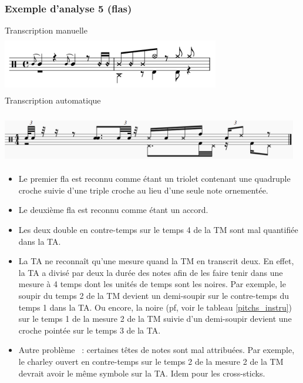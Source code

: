 \subsubsection{Exemple d’analyse 5 (flas)}
\label{flas}
Transcription manuelle\\
\includegraphics[height=25mm, width=95mm]{
z_images/4_experimentations/1_analyses/2_flas/0_124_funk_95_fill_4-4.png}\\
Transcription automatique\\\\
\includegraphics[height=20mm, width=130mm]{
z_images/4_experimentations/1_analyses/2_flas/1_124_funk_95_fill_4-4.png}\\

\begin{itemize}
	\item Le premier fla est reconnu comme étant un triolet contenant une
        quadruple croche suivie d’une triple croche au lieu d’une seule note
        ornementée.
	\item Le deuxième fla est reconnu comme étant un accord.
	\item Les deux double en contre-temps sur le temps 4 de la TM sont mal
        quantifiée dans la TA. 
	\item La TA ne reconnaît qu’une mesure quand la TM en transcrit deux. En
        effet, la TA a divisé par deux la durée des notes afin de les faire
        tenir dans une mesure à 4 temps dont les unités de temps sont les
        noires. Par exemple, le soupir du temps 2 de la TM devient un
        demi-soupir sur le contre-temps du temps 1 dans la TA. Ou encore, la
        noire (pf, voir le tableau \ref{pitchs_instru}) sur le temps 1 de la
        mesure 2 de la TM suivie d’un demi-soupir devient une croche pointée
        sur le temps 3 de la TA.
	\item Autre problème~ : certaines têtes de notes sont mal attribuées. Par
        exemple, le charley ouvert en contre-temps sur le temps 2 de la mesure
        2 de la TM devrait avoir le même symbole sur la TA. Idem pour les
        cross-sticks.
\end{itemize}

